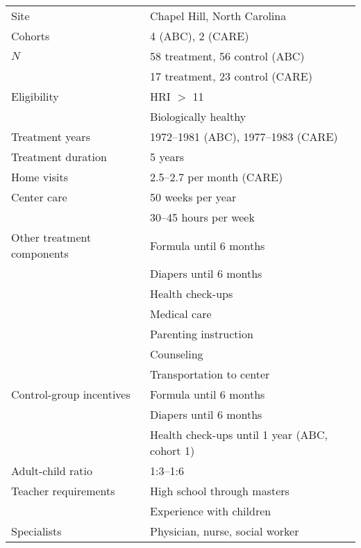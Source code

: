 \begin{tabular}{l l}
	\toprule
Site & Chapel Hill, North Carolina \\
Cohorts & 4 (ABC), 2 (CARE) \\
$N$ & 58 treatment, 56 control (ABC) \\
	& 17 treatment, 23 control (CARE) \\
\midrule
Eligibility & HRI $>$ 11 \\
		& Biologically healthy \\
\midrule
Treatment years & 1972--1981 (ABC), 1977--1983 (CARE) \\
Treatment duration & 5 years \\
\midrule
Home visits 	& 2.5--2.7	per month (CARE)	\\
Center care	& 50	weeks per year \\
		 	& 30--45 hours per week  \\
Other treatment components & Formula until 6 months\\
					& Diapers until 6 months \\ 
					& Health check-ups \\
					& Medical care \\
					& Parenting instruction \\
					& Counseling \\
					& Transportation to center \\
Control-group incentives & Formula until 6 months \\
				& Diapers until 6 months 	\\
				& Health check-ups until 1 year (ABC, cohort 1) \\
\midrule
Adult-child ratio & 1:3--1:6 \\
Teacher requirements & High school through masters \\
				& Experience with children \\
Specialists & Physician, nurse, social worker \\
\bottomrule
\end{tabular}


